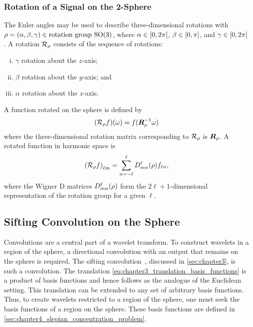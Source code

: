 \subsubsection{Rotation of a Signal on the 2-Sphere}

The Euler angles may be used to describe three-dimensional rotations with \(\rho = (\alpha,\beta,\gamma) \in \text{rotation group } \text{SO(3)}{}\), where \(\alpha \in \interval[open right]{0}{2\pi}\), \(\beta \in \interval{0}{\pi}\), and \(\gamma \in \interval[open right]{0}{2\pi}\).
A rotation \(\mathcal{R}_{\rho}\) consists of the sequence of rotations:
%
\begin{enumerate}[(i),nosep,left=\parindent]
	\item \({\gamma}\) rotation about the \(z\)-axis;
	\item \({\beta}\) rotation about the \(y\)-axis; and
	\item \({\alpha}\) rotation about the \(z\)-axis.
\end{enumerate}
%
A function rotated on the sphere is defined by
%
\begin{equation}
	(\mathcal{R}_{\rho}f)(\omega)
	= f(\vb*{R}_{\rho}^{-1} \omega)
\end{equation}
%
where the three-dimensional rotation matrix corresponding to \(\mathcal{R}_{\rho}\) is \(\vb*{R}_{\rho}{}\).
A rotated function in harmonic space is
%
\begin{equation}
	{(\mathcal{R}_{\rho}f)}_{\ell m}
	= \displaystyle\sum\limits_{n=-\ell}^{\ell} D^{\ell}_{mn}(\rho) f_{\ell n},
\end{equation}
%
where the Wigner D matrices \(D^{\ell}_{mn}(\rho)\) form the \(2\ell+1\)-dimensional representation of the rotation group for a given \(\ell{}\).

\subsection{Sifting Convolution on the Sphere}\label{sec:chapter4_sifting_convolution_sphere}

Convolutions are a central part of a wavelet transform.
To construct wavelets in a region of the sphere, a directional convolution with an output that remains on the sphere is required.
The sifting convolution~\cite{Roddy2021}, discussed in \cref{sec:chapter3}, is such a convolution.
The translation \cref{eq:chapter3_translation_basis_functions} is a product of basis functions and hence follows as the analogue of the Euclidean setting.
This translation can be extended to any set of arbitrary basis functions.
Thus, to create wavelets restricted to a region of the sphere, one must seek the basis functions of a region on the sphere.
These basis functions are defined in \cref{sec:chapter4_slepian_concentration_problem}.

